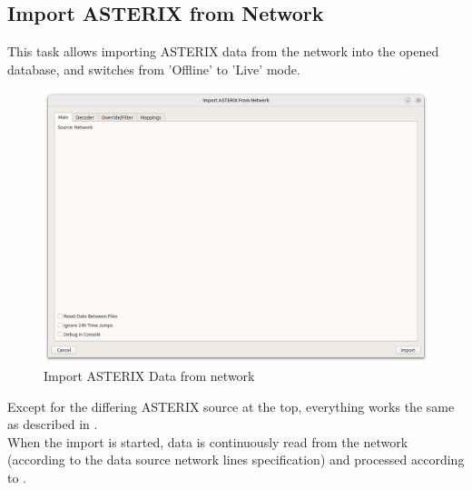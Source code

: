 \subsection{Import ASTERIX from Network}
\label{sec:ui_import_asterix_network}

This task allows importing ASTERIX data from the network into the opened database, and switches from 'Offline' to 'Live' mode. \\

\begin{figure}[H]
  \center
    \hspace*{-0.5cm}
    \includegraphics[width=17cm]{figures/asterix_import_data_network.png}
  \caption{Import ASTERIX Data from network}
\end{figure}

Except for the differing ASTERIX source at the top, everything works the same as described in . \\

When the import is started, data is continuously read from the network (according to the data source network lines specification) and processed according to .
